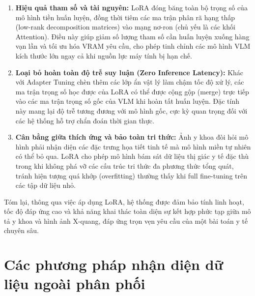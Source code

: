 \begin{enumerate}
    \item \textbf{Hiệu quả tham số và tài nguyên:} LoRA đóng băng toàn bộ trọng số của mô hình tiền huấn luyện, đồng thời tiêm các ma trận phân rã hạng thấp (low-rank decomposition matrices) vào mạng nơ-ron (chủ yếu là các khối Attention). Điều này giúp giảm số lượng tham số cần huấn luyện xuống hàng vạn lần và tối ưu hóa VRAM yêu cầu, cho phép tinh chỉnh các mô hình VLM kích thước lớn ngay cả khi nguồn lực máy tính bị hạn chế.
    \item \textbf{Loại bỏ hoàn toàn độ trễ suy luận (Zero Inference Latency):} Khác với Adapter Tuning chèn thêm các lớp ẩn vật lý làm chậm tốc độ xử lý, các ma trận trọng số học được của LoRA có thể được cộng gộp (merge) trực tiếp vào các ma trận trọng số gốc của VLM khi hoàn tất huấn luyện. Đặc tính này mang lại độ trễ tương đương với mô hình gốc, cực kỳ quan trọng đối với các hệ thống hỗ trợ chẩn đoán thời gian thực.
    \item \textbf{Cân bằng giữa thích ứng và bảo toàn tri thức:} Ảnh y khoa đòi hỏi mô hình phải nhận diện các đặc trưng họa tiết tinh tế mà mô hình miền tự nhiên có thể bỏ qua. LoRA cho phép mô hình bám sát dữ liệu thị giác y tế đặc thù trong khi không phá vỡ các cấu trúc tri thức đa phương thức tổng quát, tránh hiện tượng quá khớp (overfitting) thường thấy khi full fine-tuning trên các tập dữ liệu nhỏ.
\end{enumerate}
Tóm lại, thông qua việc áp dụng LoRA, hệ thống được đảm bảo tính linh hoạt, tốc độ đáp ứng cao và khả năng khai thác toàn diện sự kết hợp phức tạp giữa mô tả y khoa và hình ảnh X-quang, đáp ứng trọn vẹn yêu cầu của một bài toán y tế chuyên sâu.  
 
\section{Các phương pháp nhận diện dữ liệu ngoài phân phối}